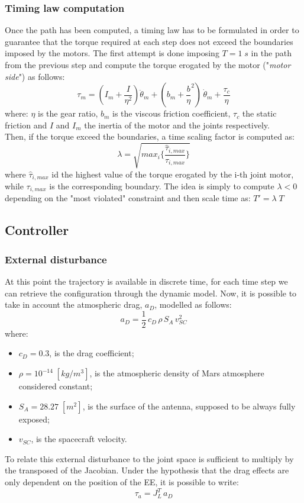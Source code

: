 \documentclass[main.tex]{subfiles}
\begin{document}
\subsubsection{Timing law computation}
Once the path has been computed, a timing law has to be formulated in order to guarantee that the torque required at each step does not exceed the boundaries imposed by the motors. The first attempt is done imposing $T=1\; s$ in the path from the previous step and compute the torque erogated by the motor ("\textit{motor side}") as follows:
$$\tau_m=\left (I_m+\dfrac{I}{\eta^2}\right)\ddot{\theta}_m + \left(b_m+\dfrac{b}{\eta}^2\right)\,\dot{\theta}_m + \dfrac{\tau_c}{\eta}$$
where: $\eta$ is the gear ratio, $b_m$ is the viscous friction coefficient, $\tau_c$ the static friction and $I$ and $I_m$ the inertia of the motor and the joints respectively. \\
Then, if the torque exceed the boundaries, a time scaling factor is computed as:
$$\lambda = \sqrt{max_i\bigg\{\frac{\hat{\tau}_{i,max}}{\tau_{i,max}}\bigg\}}$$
where $\hat{\tau}_{i,max}$ id the highest value of the torque erogated by the i-th joint motor, while $\tau_{i,max}$ is the corresponding boundary. The idea is simply to compute $\lambda < 0$ depending on the "most violated" constraint and then scale time as: $T'=\lambda\;T$



\subsection{Controller}
\subsubsection{External disturbance}
At this point the trajectory is available in discrete time, for each time step we can retrieve the configuration through the dynamic model. Now, it is possible to take in account the atmospheric drag, $a_D$, modelled as follows:
$$a_D=\frac{1}{2}\,c_D\,\rho\,S_A\,v_{SC}^2$$
where:
\begin{itemize}
    \item $c_D = 0.3$, is the drag coefficient;
    \item $\rho = 10^{-14}\; [kg/m^3]$, is the atmospheric density of Mars atmosphere considered constant;
    \item $S_A = 28.27\; [m^2]$, is the surface of the antenna, supposed to be always fully exposed;
    \item $v_{SC}$, is the spacecraft velocity.
\end{itemize}
To relate this external disturbance to the joint space is sufficient to multiply by the transposed of the Jacobian. Under the hypothesis that the drag effects are only dependent on the position of the EE, it is possible to write:
$$\tau_a=J_L^T\,a_D$$
\end{document}
